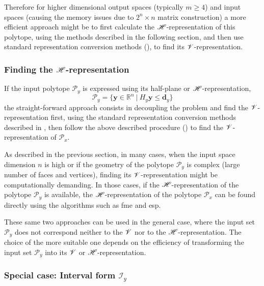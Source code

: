 Therefore for higher dimensional output spaces (typically $m\geq 4$) and input spaces (causing the memory issues due to  $2^n \times n$ matrix construction) a more efficient approach might be to first calculate the $\mathscr{H}$-representation of this polytope, using the methods described in the following section, and then use standard representation conversion methods (), to find its $\mathscr{V}$-representation.


\subsubsection{Finding the $\mathscr{H}$-representation}
\label{ch:proj_algos_h}

If the input polytope $\mathcal{P}_y$ is expressed using its half-plane or $\mathscr{H}$-representation, 
\begin{equation}
    \mathcal{P}_y = \{ \bm{y}\in\mathbb{R}^n ~|~H_y\bm{y} \leq \bm{d}_y\}
\end{equation}
the straight-forward approach consists in decoupling the problem and find the $\mathscr{V}$-representation first, using the standard representation conversion methods  described in , then follow the above described procedure () to find the $\mathscr{V}$-representation of $\mathcal{P}_x$. 

As described in the previous section, in many cases, when the input space dimension $n$ is high or if the geometry of the polytope  $\mathcal{P}_y$ is complex (large number of faces and vertices), finding its $\mathscr{V}$-representation might be computationally demanding. In those cases, if the $\mathscr{H}$-representation of the polytope $\mathcal{P}_y$ is available, the $\mathscr{H}$-representation of the polytope $\mathcal{P}_x$ can be found directly using the algorithms such as \gls{fme} and \gls{esp}. 

These same two approaches can be used in the general case, where the input set $\mathcal{P}_y$ does not correspond neither to the $\mathscr{V}$ nor to the $\mathscr{H}$-representation. The choice of the more suitable one depends on the efficiency of transforming the input set $\mathcal{P}_y$ into its $\mathscr{V}$ or $\mathscr{H}$-representation. 

\subsubsection*{Special case: Interval form $\mathcal{I}_y$} 


